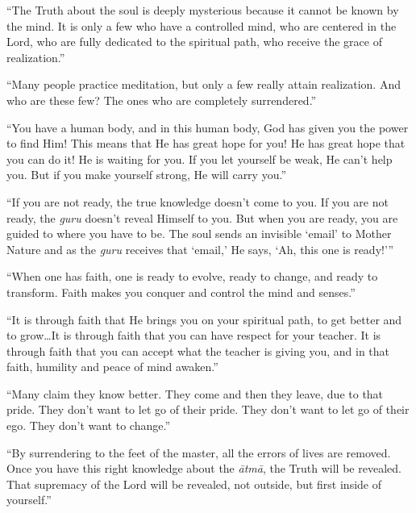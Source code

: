 \enquote{The Truth about the soul is deeply mysterious because it cannot be known by the mind. It is only a few who have a controlled mind, who are centered in the Lord, who are fully dedicated to the spiritual path, who receive the grace of realization.}

\enquote{Many people practice meditation, but only a few really attain realization. And who are these few? The ones who are completely surrendered.}

\enquote{You have a human body, and in this human body, God has given you the power to find Him! This means that He has great hope for you! He has great hope that you can do it! He is waiting for you. If you let yourself be weak, He can’t help you. But if you make yourself strong, He will carry you.}

\enquote{If you are not ready, the true knowledge doesn’t come to you. If you are not ready, the \textit{guru} doesn’t reveal Himself to you. But when you are ready, you are guided to where you have to be. The soul sends an invisible \enquote{email} to Mother Nature and as the \textit{guru} receives that \enquote{email,} He says, \enquote{Ah, this one is ready!}}

\enquote{When one has faith, one is ready to evolve, ready to change, and ready to transform. Faith makes you conquer and control the mind and senses.}

\enquote{It is through faith that He brings you on your spiritual path, to get better and to grow\ldots It is through faith that you can have respect for your teacher. It is through faith that you can accept what the teacher is giving you, and in that faith, humility and peace of mind awaken.}

\enquote{Many claim they know better. They come and then they leave, due to that pride. They don’t want to let go of their pride. They don’t want to let go of their ego. They don’t want to change.}

\enquote{By surrendering to the feet of the master, all the errors of lives are removed. Once you have this right knowledge about the \textit{ātmā}, the Truth will be revealed. That supremacy of the Lord will be revealed, not outside, but first inside of yourself.}
